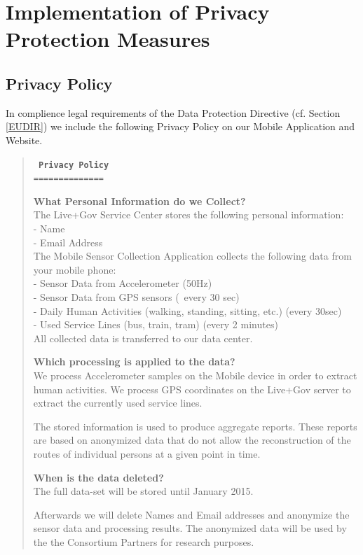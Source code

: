 \chapter{Implementation of Privacy Protection Measures}
\section{Privacy Policy}

In complience legal requirements of the Data Protection Directive (cf. Section \ref{EUDIR}) we include the following
Privacy Policy on our Mobile Application and Website.

\begin{quote}
\tt \small
\textbf{Privacy Policy}\\
==============

\textbf{What Personal Information do we Collect?}\\
The Live+Gov Service Center stores the following personal information:\\
- Name\\
- Email Address\\

The Mobile Sensor Collection Application collects the following data from your mobile phone:\\
- Sensor Data from Accelerometer (50Hz)\\
- Sensor Data from GPS sensors (~every 30 sec)\\
- Daily Human Activities (walking, standing, sitting, etc.) (every 30sec)\\
- Used Service Lines (bus, train, tram) (every 2 minutes)\\

All collected data is transferred to our data center.

\textbf{Which processing is applied to the data?}\\
We process Accelerometer samples on the Mobile device in order to extract human activities.
We process GPS coordinates on the Live+Gov server to extract the currently used service lines.

The stored information is used to produce aggregate reports.
These reports are based on anonymized data that do not allow the reconstruction of the routes of individual persons at a given point in time.

\textbf{When is the data deleted?}\\
The full data-set will be stored until January 2015.

Afterwards we will delete Names and Email addresses and anonymize
the sensor data and processing results.  The anonymized data will
be used by the the Consortium Partners for research purposes.


\end{quote}

